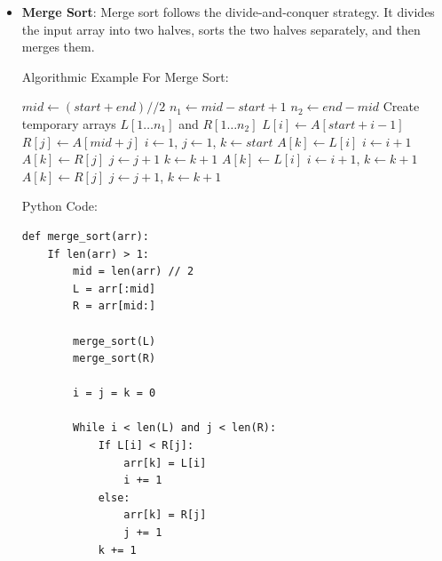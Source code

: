 \documentclass[12pt]{book} %
\begin{document}
\begin{itemize}
    \item \textbf{Merge Sort}: Merge sort follows the divide-and-conquer strategy. It divides the input array into two halves, sorts the two halves separately, and then merges them.

 Algorithmic Example For Merge Sort:
     \FloatBarrier %
\begin{algorithm}
\caption{Merge Sort}
\begin{algorithmic}[1]
        \State $mid \gets (start + end) // 2$
        \State {}
        \State {}
        \State {}
    \EndIf
\EndFunction
\FloatBarrier %
    \State $n_1 \gets mid - start + 1$
    \State $n_2 \gets end - mid$
    \State Create temporary arrays $L[1 \dots n_1]$ and $R[1 \dots n_2]$
        \State $L[i] \gets A[start + i - 1]$
    \EndFor
        \State $R[j] \gets A[mid + j]$
    \EndFor
    \State $i \gets 1$, $j \gets 1$, $k \gets start$
            \State $A[k] \gets L[i]$
            \State $i \gets i + 1$
        \Else
            \State $A[k] \gets R[j]$
            \State $j \gets j + 1$
        \EndIf
        \State $k \gets k + 1$
    \EndWhile
        \State $A[k] \gets L[i]$
        \State $i \gets i + 1$, $k \gets k + 1$
    \EndWhile
        \State $A[k] \gets R[j]$
        \State $j \gets j + 1$, $k \gets k + 1$
    \EndWhile
\EndFunction
\end{algorithmic}
\end{algorithm}
\FloatBarrier %
Python Code:
\FloatBarrier %
\begin{verbatim}
def merge_sort(arr):
    If len(arr) > 1:
        mid = len(arr) // 2
        L = arr[:mid]
        R = arr[mid:]

        merge_sort(L)
        merge_sort(R)

        i = j = k = 0

        While i < len(L) and j < len(R):
            If L[i] < R[j]:
                arr[k] = L[i]
                i += 1
            else:
                arr[k] = R[j]
                j += 1
            k += 1


\end{verbatim}
\end{itemize}
\end{document}
